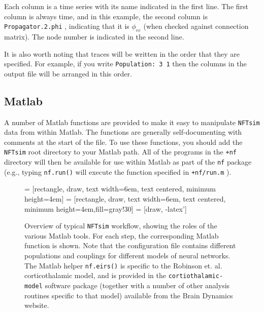 \documentclass[12pt,a4paper]{article}
\newcommand{\type}[1]{{\small\small\tt #1} }
\newcommand{\NF}[0]{\type{NFTsim}}
\begin{document}
Each column is a time series with its name indicated in the first line. The first column is always time, and in this example, the second column is \type{Propagator.2.phi}, indicating that it is $\phi_{ee}$ (when checked against connection matrix). The node number is indicated in the second line.

It is also worth noting that traces will be written in the order that they are specified. For example, if you write \type{Population: 3 1} then the columns in the output file will be arranged in this order.

\subsection{Matlab}
A number of Matlab functions are provided to make it easy to manipulate \NF data from within Matlab. The functions are generally self-documenting with comments at the start of the file. To use these functions, you should add the \NF root directory to your Matlab path. All of the programs in the \type{+nf} directory will then be available for use within Matlab as part of the \type{nf} package (e.g., typing \type{nf.run()} will execute the function specified in \type{+nf/run.m}).

\begin{figure}[b]
\begin{center}
 = [rectangle, draw, text width=6em, text centered, minimum height=4em]
 = [rectangle, draw, text width=6em, text centered, minimum height=4em,fill=gray!30]
 = [draw, -latex']
\caption{Overview of typical \NF workflow, showing the roles of the various Matlab tools. For each step, the corresponding Matlab function is shown. Note that the configuration file contains different populations and couplings for different models of neural networks. The Matlab helper \type{nf.eirs()} is specific to the Robinson et. al. corticothalamic model, and is provided in the \type{cortiothalamic-model} software package (together with a number of other analysis routines specific to that model) available from the Brain Dynamics website.}
\label{fig:components}
\end{center}
\end{figure}
\end{document}
